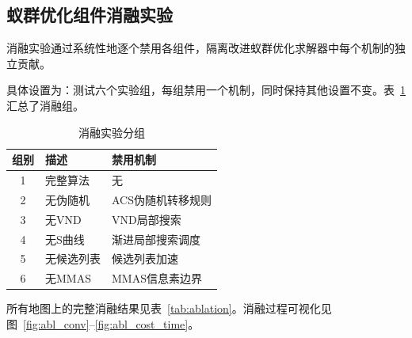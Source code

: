 \documentclass[lettersize,journal]{IEEEtran}
\begin{document}
\subsection{蚁群优化组件消融实验}

\label{subsec:exp_ablation}

消融实验通过系统性地逐个禁用各组件，隔离改进蚁群优化求解器中每个机制的独立贡献。

具体设置为：测试六个实验组，每组禁用一个机制，同时保持其他设置不变。表~\ref{tab:ablation_groups}汇总了消融组。

\begin{table}[!t]

\caption{消融实验分组}
\label{tab:ablation_groups}
\centering
\begin{tabular}{cll}
\toprule
组别 & 描述 & 禁用机制 \\
\midrule
1 & 完整算法 & 无 \\
2 & 无伪随机 & ACS伪随机转移规则 \\
3 & 无VND & VND局部搜索 \\
4 & 无S曲线 & 渐进局部搜索调度 \\
5 & 无候选列表 & 候选列表加速 \\
6 & 无MMAS & MMAS信息素边界 \\
\bottomrule
\end{tabular}
\end{table}

所有地图上的完整消融结果见表~\ref{tab:ablation}。消融过程可视化见图~\ref{fig:abl_conv}--\ref{fig:abl_cost_time}。
\end{document}
